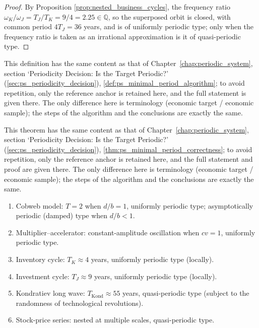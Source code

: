 \begin{proof}
By Proposition \ref{prop:nested_business_cycles}, the frequency ratio $\omega_K/\omega_J=T_J/T_K=9/4=2.25\in\mathbb Q$, so the superposed orbit is closed, with common period $4T_J=36$ years, and is of uniformly periodic type; only when the frequency ratio is taken as an irrational approximation is it of quasi-periodic type.
\end{proof}

\begin{definition}\label{def:econ_minimal_period_algorithm}
This definition has the same content as that of Chapter~\ref{chap:periodic_system}, section `Periodicity Decision: Is the Target Periodic?' (\cref{sec:ps_periodicity_decision}), \cref{def:ps_minimal_period_algorithm}; to avoid repetition, only the reference anchor is retained here, and the full statement is given there. The only difference here is terminology (economic target / economic sample); the steps of the algorithm and the conclusions are exactly the same.
\end{definition}

\begin{theorem}\label{thm:econ_minimal_period_correctness}
This theorem has the same content as that of Chapter~\ref{chap:periodic_system}, section `Periodicity Decision: Is the Target Periodic?' (\cref{sec:ps_periodicity_decision}), \cref{thm:ps_minimal_period_correctness}; to avoid repetition, only the reference anchor is retained here, and the full statement and proof are given there. The only difference here is terminology (economic target / economic sample); the steps of the algorithm and the conclusions are exactly the same.
\end{theorem}

\begin{example}\label{ex:econ_periodic_examples}
\begin{enumerate}[label=(\roman*)]
    \item Cobweb model: $T=2$ when $d/b=1$, uniformly periodic type; asymptotically periodic (damped) type when $d/b<1$.
    \item Multiplier--accelerator: constant-amplitude oscillation when $cv=1$, uniformly periodic type.
    \item Inventory cycle: $T_K\approx4$ years, uniformly periodic type (locally).
    \item Investment cycle: $T_J\approx9$ years, uniformly periodic type (locally).
    \item Kondratiev long wave: $T_{\mathrm{Kond}}\approx55$ years, quasi-periodic type (subject to the randomness of technological revolutions).
    \item Stock-price series: nested at multiple scales, quasi-periodic type.
\end{enumerate}
\end{example}

